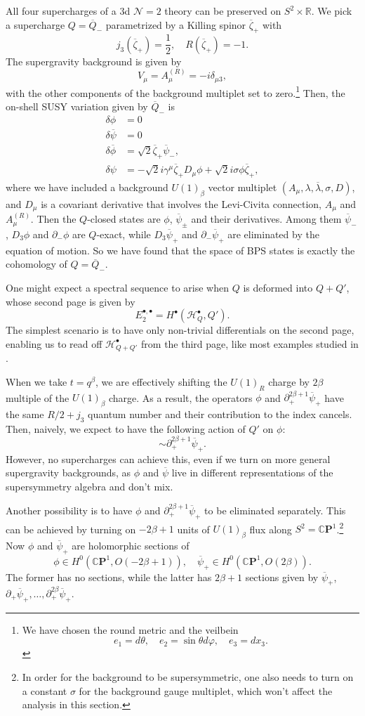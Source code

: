 \documentclass[hyper,letterpaper]{JHEP3}
\newcommand{\be}{\begin{equation}}
\newcommand{\ee}{\end{equation}}
\newcommand{\beq}{\begin{equation}\begin{aligned}}
\newcommand{\eeq}{\end{aligned}\end{equation}}
\newcommand{\R}{{\mathbb R}}
\newcommand{\cp}{{\mathbb{C}}{\mathbf{P}}}
\renewcommand{\bar}{\overline}
\def\CH{{\mathcal H}}
\def\CN{{\mathcal N}}
\begin{document}
All four supercharges of a 3d $\CN=2$ theory can be preserved on $S^2\times \R$. We pick a supercharge $Q=\bar{Q}_-$ parametrized by a Killing spinor $\bar{\zeta}_+$ with
\be
j_3(\bar{\zeta}_+)=\frac{1}{2},\quad R(\bar{\zeta}_+)=-1.
\ee
The supergravity background is given by
\be
V_\mu=A_\mu^{(R)}=-i\delta_{\mu 3},
\ee
with the other components of the background multiplet set to zero.\footnote{We have chosen the round metric and the veilbein
\be
e_1=d\theta,\quad e_2=\sin \theta d\varphi, \quad e_3=dx_3.
\ee
} Then, the on-shell SUSY variation given by $\bar{Q}_-$ is
\beq\label{QTrans}
\delta\phi&=0\\
\delta\bar{\psi}&=0\\
\delta\bar{\phi}&=\sqrt{2} \bar{\zeta}_+\bar{\psi}_-,\\
\delta\psi&=-\sqrt{2} i\gamma^\mu \bar{\zeta}_+ D_\mu \phi+\sqrt{2} i \sigma \phi \bar{\zeta}_+,
\eeq
where we have included a background $U(1)_{\beta}$ vector multiplet $(A_\mu,\lambda,\bar{\lambda},\sigma,D)$, and $D_\mu$ is a covariant derivative that involves the Levi-Civita connection, $A_\mu$ and $A_\mu^{(R)}$. Then the $Q$-closed states are $\phi$, $\bar{\psi}_\pm$ and their derivatives. Among them $\bar{\psi}_-$, $D_3\phi$ and $\partial_-\phi$ are $Q$-exact, while $D_3\bar{\psi}_+$ and $\partial_-\bar{\psi}_+$ are eliminated by the equation of motion. So we have found that the space of BPS states is exactly the cohomology of $Q=\bar{Q}_-$.

One might expect a spectral sequence to arise when $Q$ is deformed into $Q+Q'$, whose second page is given by
\be
E_2^{\bullet,\bullet}=H^{\bullet}(\CH^{\bullet}_Q,Q').
\ee
The simplest scenario is to have only non-trivial differentials on the second page, enabling us to read off $\CH^{\bullet}_{Q+Q'}$ from the third page, like most examples studied in \cite{Gukov:2015gmm}.

When we take $t=q^\beta$, we are effectively shifting the $U(1)_R$ charge by $2\beta$ multiple of the $U(1)_{\beta}$ charge. As a result, the operators $\phi$ and $\partial_+^{2\beta+1}\bar{\psi}_+$ have the same $R/2+j_3$ quantum number and their contribution to the index cancels. Then, naively, we expect to have the following action of $Q'$ on $\phi$:
\be
[Q',\phi]\sim\partial_+^{2\beta+1}\bar{\psi}_+.
\ee
However, no supercharges can achieve this, even if we turn on more general supergravity backgrounds, as $\phi$ and $\bar{\psi}$ live in different representations of the supersymmetry algebra and don't mix.

Another possibility is to have $\phi$ and $\partial_+^{2\beta+1}\bar{\psi}_+$ to be eliminated separately. This can be achieved by turning on $-2\beta+1$ units of $U(1)_{\beta}$ flux along $S^2=\cp^1$.\footnote{In order for the background to be supersymmetric, one also needs to turn on a constant $\sigma$ for the background gauge multiplet, which won't affect the analysis in this section.} Now $\phi$ and $\bar{\psi}_+$ are holomorphic sections of
\be
\phi\in H^0(\cp^1,O(-2\beta+1)),\quad \bar{\psi}_+\in H^0(\cp^1,O(2\beta)).
\ee
The former has no sections, while the latter has $2\beta+1$ sections given by $\bar{\psi}_+$, $\partial_+\bar{\psi}_+,\ldots, \partial_+^{2\beta}\bar{\psi}_+$.
\end{document}
